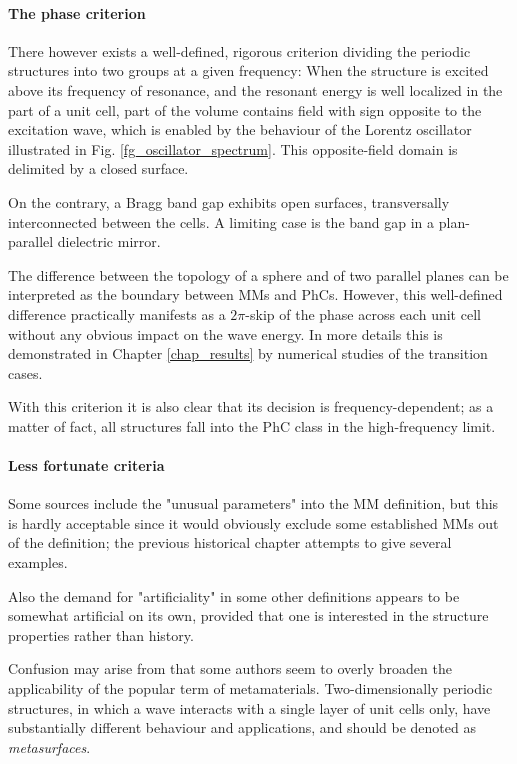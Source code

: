 \paragraph{The phase criterion} %
There however exists a well-defined, rigorous criterion dividing the periodic structures into two groups at a given frequency: When the structure is excited above its frequency of resonance, and the resonant energy is well localized in the part of a unit cell, part of the volume contains field with sign opposite to the excitation wave, which is enabled by the behaviour of the Lorentz oscillator illustrated in Fig. \ref{fg_oscillator_spectrum}. %
This opposite-field domain is delimited by a closed surface.

On the contrary, a Bragg band gap exhibits open surfaces, transversally interconnected between the cells. A limiting case is the band gap in a plan-parallel dielectric mirror.

The difference between the topology of a sphere and of two parallel planes can be interpreted as the boundary between MMs and PhCs. However, this well-defined difference practically manifests as a $2\pi$-skip of the phase across each unit cell without any obvious impact on the wave energy. In more details this is demonstrated in Chapter \ref{chap_results} %
by numerical studies of the transition cases.

With this criterion it is also clear that its decision is frequency-dependent; as a matter of fact, all structures fall into the PhC class in the high-frequency limit.

\paragraph{Less fortunate criteria} %
Some sources include the "unusual parameters" into the MM definition, but this is hardly acceptable since it would obviously exclude some established MMs out of the definition; the previous historical chapter attempts to give several examples. 

Also the demand for "artificiality" in some other definitions appears to be somewhat artificial on its own, provided that one is interested in the structure properties rather than history.
 
Confusion may arise from that some authors seem to overly broaden the applicability of the popular term of metamaterials. Two-dimensionally periodic structures, in which a wave interacts with a single layer of unit cells only, have substantially different behaviour and applications, and should be denoted as \textit{metasurfaces}.

